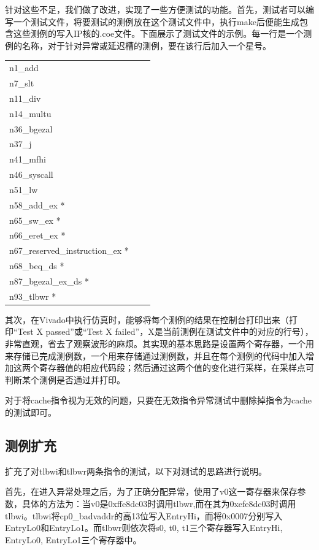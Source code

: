 \documentclass[11pt,utf8]{article}
\begin{document}
{{{针对这些不足，我们做了改进，实现了一些方便测试的功能。首先，测试者可以编写一个测试文件，将要测试的测例放在这个测试文件中，执行make后便能生成包含这些测例的写入IP核的.coe文件。下面展示了测试文件的示例。每一行是一个测例的名称，对于针对异常或延迟槽的测例，要在该行后加入一个星号。
\begin{table}[!htb]
	\begin{center}
		\begin{tabular*}{15cm}{lll}  
			\hline  
n1\_add\\
n7\_slt\\
n11\_div\\
n14\_multu\\
n36\_bgezal\\
n37\_j\\
n41\_mfhi\\
n46\_syscall\\
n51\_lw\\
n58\_add\_ex *\\
n65\_sw\_ex *\\
n66\_eret\_ex *\\
n67\_reserved\_instruction\_ex *\\
n68\_beq\_ds *\\
n87\_bgezal\_ex\_ds *\\
n93\_tlbwr *\\
			\hline  
		\end{tabular*}  
	\end{center}
\end{table}

其次，在Vivado中执行仿真时，能够将每个测例的结果在控制台打印出来（打印“Test X passed”或“Test X failed”，X是当前测例在测试文件中的对应的行号），非常直观，省去了观察波形的麻烦。其实现的基本思路是设置两个寄存器，一个用来存储已完成测例数，一个用来存储通过测例数，并且在每个测例的代码中加入增加这两个寄存器值的相应代码段；然后通过这两个值的变化进行采样，在采样点可判断某个测例是否通过并打印。

对于将cache指令视为无效的问题，只要在无效指令异常测试中删除掉指令为cache的测试即可。
}
\subsection{测例扩充} {
扩充了对tlbwi和tlbwr两条指令的测试，以下对测试的思路进行说明。

首先，在进入异常处理之后，为了正确分配异常，使用了v0这一寄存器来保存参数，具体的方法为：当v0是0xffe8dc03时调用tlbwr,而在其为0xefe8dc03时调用tlbwi。tlbwi将cp0\_badvaddr的高13位写入EntryHi，而将0x0007分别写入EntryLo0和EntryLo1。而tlbwr则依次将s0, t0, t1三个寄存器写入EntryHi, EntryLo0, EntryLo1三个寄存器中。

}}}
\end{document}
